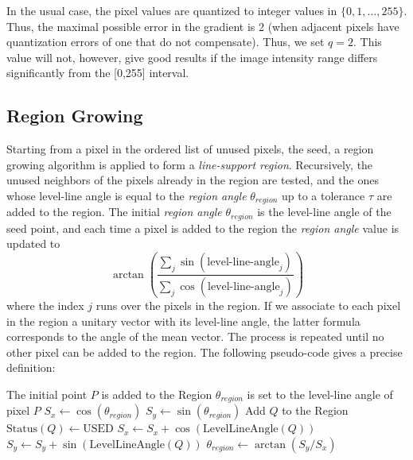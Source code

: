 \documentclass{ipol}
\begin{document}
In the usual case, the pixel values are quantized to integer values in
$\{0,1,\dots,255\}$. Thus, the maximal possible error in the gradient
is 2 (when adjacent pixels have quantization errors of one that do not
compensate). Thus, we set $q=2$.  This value will not, however, give
good results if the image intensity range differs significantly from
the [0,255] interval.


\subsection{Region Growing}

Starting from a pixel in the ordered list of unused pixels, the seed,
a region growing algorithm is applied to form a \emph{line-support
region}.  Recursively, the unused neighbors of the pixels already in
the region are tested, and the ones whose level-line angle is equal to
the \emph{region angle} $\theta_{region}$ up to a tolerance $\tau$ are
added to the region. The initial \emph{region angle} $\theta_{region}$
is the level-line angle of the seed point, and each time a pixel is
added to the region the \emph{region angle} value is updated to
$$
   \arctan\left(\frac{\sum_j \sin(\textrm{level-line-angle}_j)}
                       {\sum_j \cos(\textrm{level-line-angle}_j)}\right)
$$
where the index $j$ runs over the pixels in the region. If we
associate to each pixel in the region a unitary vector with its
level-line angle, the latter formula corresponds to the angle of the
mean vector. The process is repeated until no other pixel can be added
to the region. The following pseudo-code gives a precise definition:

\begin{algorithm}
The initial point $P$ is added to the Region $\theta_{region}$ is set
  to the level-line angle of pixel $P$\;
$S_x\leftarrow\cos(\theta_{region})$\;
$S_y\leftarrow\sin(\theta_{region})$\;
  {
      {
          {
            Add $Q$ to the Region\;
            $\textrm{Status}(Q)\leftarrow\textrm{USED}$\;
            $S_x \leftarrow S_x+\cos(\textrm{LevelLineAngle}(Q))$\;
            $S_y \leftarrow S_y+\sin(\textrm{LevelLineAngle}(Q))$\;
            $\theta_{region} \leftarrow \arctan(S_y/S_x)$\;
          }
      }
  }
\end{algorithm}
\end{document}
